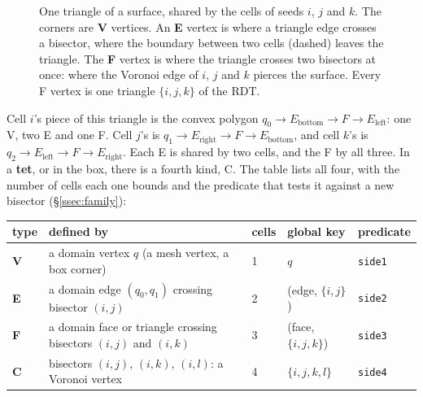 \documentclass[11pt,a4paper]{article}
\newcommand{\code}[1]{\texttt{#1}}          %
\newcommand{\secref}[1]{\S\ref{#1}}
\begin{document}
\begin{figure}[ht]
\centering
{}
\caption{One triangle of a surface, shared by the cells of seeds $i$, $j$ and $k$. The corners
are \textbf{V} vertices. An \textbf{E} vertex is where a triangle edge crosses a bisector, where
the boundary between two cells (dashed) leaves the triangle. The \textbf{F} vertex is where the
triangle crosses two bisectors at once: where the Voronoi edge of $i$, $j$ and $k$ pierces the
surface. Every F vertex is one triangle $\{i,j,k\}$ of the RDT.}
\label{fig:triangle}
\end{figure}

Cell $i$'s piece of this triangle is the convex polygon $q_0 \to E_\text{bottom} \to F \to
E_\text{left}$: one V, two E and one F. Cell $j$'s is $q_1 \to E_\text{right} \to F \to
E_\text{bottom}$, and cell $k$'s is $q_2 \to E_\text{left} \to F \to E_\text{right}$. Each E is
shared by two cells, and the F by all three. In a \textbf{tet}, or in the box, there is a fourth
kind, C. The table lists all four, with the number of cells each one bounds and the predicate
that tests it against a new bisector (\secref{ssec:family}):

{\small
\begin{xltabular}{\linewidth}{@{}P{0.8cm} L P{1.2cm} P{2.8cm} P{1.6cm}@{}}
\toprule
type & defined by & cells & global key & predicate \\
\midrule
\endhead
\textbf{V} & a domain vertex $q$ (a mesh vertex, a box corner) & 1 & $q$ & \code{side1} \\
\textbf{E} & a domain edge $(q_0, q_1)$ crossing bisector $(i, j)$ & 2 & (edge, $\{i,j\}$)
  & \code{side2} \\
\textbf{F} & a domain face or triangle crossing bisectors $(i,j)$ and $(i,k)$ & 3
  & (face, $\{i,j,k\}$) & \code{side3} \\
\textbf{C} & bisectors $(i,j)$, $(i,k)$, $(i,l)$: a Voronoi vertex & 4 & $\{i,j,k,l\}$
  & \code{side4} \\
\bottomrule
\end{xltabular}}
\end{document}
